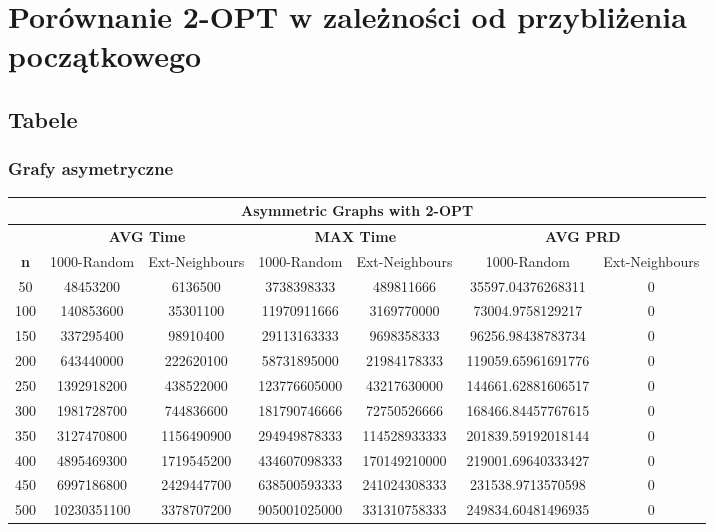\documentclass{article}
\begin{document}
\section{Porównanie 2-OPT w zależności od przybliżenia początkowego}
\subsection{Tabele}

\subsubsection{Grafy asymetryczne}

\begin{center}
\begin{tabular}{|c|c|c|c|c|c|c|}
\hline
\multicolumn{7}{|c|}{\textbf{Asymmetric Graphs with 2-OPT}}\\
\hline
 & \multicolumn{2}{|c|}{\textbf{AVG Time}} & \multicolumn{2}{|c|}{\textbf{MAX Time}} & \multicolumn{2}{|c|}{\textbf{AVG PRD}}\\
\hline
\textbf{n} & 1000-Random & Ext-Neighbours & 1000-Random & Ext-Neighbours & 1000-Random & Ext-Neighbours\\
\hline
50 & 48453200 & 6136500 & 3738398333 & 489811666 & 35597.04376268311 & 0\\
\hline
100 & 140853600 & 35301100 & 11970911666 & 3169770000 & 73004.9758129217 & 0\\
\hline
150 & 337295400 & 98910400 & 29113163333 & 9698358333 & 96256.98438783734 & 0\\
\hline
200 & 643440000 & 222620100 & 58731895000 & 21984178333 & 119059.65961691776 & 0\\
\hline
250 & 1392918200 & 438522000 & 123776605000 & 43217630000 & 144661.62881606517 & 0\\
\hline
300 & 1981728700 & 744836600 & 181790746666 & 72750526666 & 168466.84457767615 & 0\\
\hline
350 & 3127470800 & 1156490900 & 294949878333 & 114528933333 & 201839.59192018144 & 0\\
\hline
400 & 4895469300 & 1719545200 & 434607098333 & 170149210000 & 219001.69640333427 & 0\\
\hline
450 & 6997186800 & 2429447700 & 638500593333 & 241024308333 & 231538.9713570598 & 0\\
\hline
500 & 10230351100 & 3378707200 & 905001025000 & 331310758333 & 249834.60481496935 & 0\\
\hline
\end{tabular}
\end{center}
\end{document}
